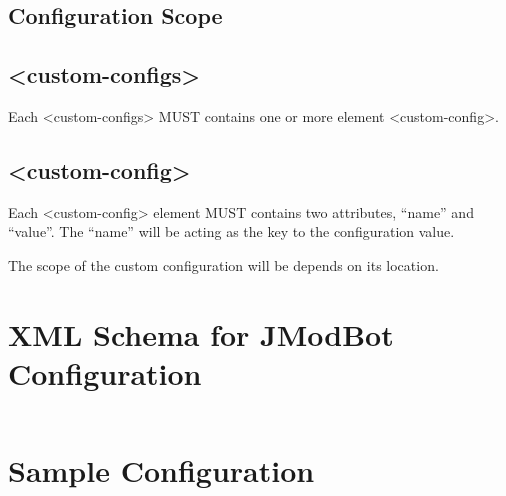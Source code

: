 \documentclass{report}
\newcommand{\elem}[1]{\textless #1\textgreater}
\begin{document}
	\section{Configuration Scope}
	\section{\elem{custom-configs}}
	Each \elem{custom-configs} MUST contains one or more element 
	\elem{custom-config}. 
    \section{\elem{custom-config}}
    Each \elem{custom-config} element MUST contains two attributes, ``name'' and 
    ``value''. The ``name'' will be acting as the key to the configuration value.
    
    The scope of the custom configuration will be depends on its location.
	\appendix
	\chapter{XML Schema for JModBot Configuration}
	\inputminted[linenos]{xml}{config.xsd}
	\chapter{Sample Configuration}
	\inputminted[linenos]{xml}{bot.sample.xml}
\end{document}
